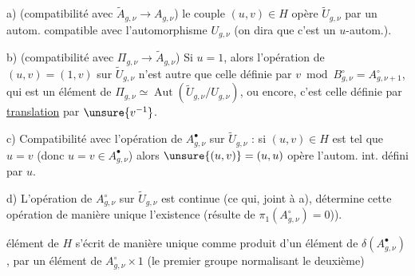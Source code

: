 
a)  (compatibilité avec \(\widetilde A_{g,\nu}\to A_{g,\nu}\)) le couple \((u,v)\in H\) opère  \(\widetilde U_{g,\nu}\) par un autom. compatible avec l'automorphisme  \(U_{g,\nu}\) (on dira que c'est un \(u\)-autom.).

b) (compatibilité avec \(\Pi_{g,\nu}\to\widetilde A_{g,\nu}\)) Si \(u=1\),  alors l'opération de \((u,v)=(1,v)\) sur \(\widetilde U_{g,\nu}\) n'est autre que celle définie par \(v\bmod B_{g,\nu}^{\circ}=A_{g,\nu+1}^{\circ}\), qui est un élément de \(\Pi_{g,\nu}\simeq\operatorname{Aut}(\widetilde U_{g,\nu}/U_{g,\nu})\), ou encore, c'est celle définie par \uline{translation}  par \(\unsure{v^{-1}}\).


c) Compatibilité avec  l'opération   de \(A_{g,\nu}^{\bullet}\) sur \(\widetilde U_{g,\nu}\) : si \((u,v)\in H\) est tel que \(u=v\) (donc \(u=v\in A_{g,\nu}^{\bullet}\)) alors \(\unsure{(u,v)}=(u,u)\) opère  l'autom. int. défini par \(u\).


d)  L'opération de \(A_{g,\nu}^{\circ}\) sur \(\widetilde U_{g,\nu}\) est continue (ce qui, joint à a), détermine cette opération de manière unique    l'existence (résulte de \(\pi_1(A_{g,\nu}^{\circ})=0\))).


 élément  de \(H\) s'écrit de manière unique comme produit d'un élément de \(\delta(A_{g,\nu}^{\bullet})\), par un élément  de \(A_{g,\nu}^{\circ}\times 1\) (le premier groupe normalisant le deuxième)


